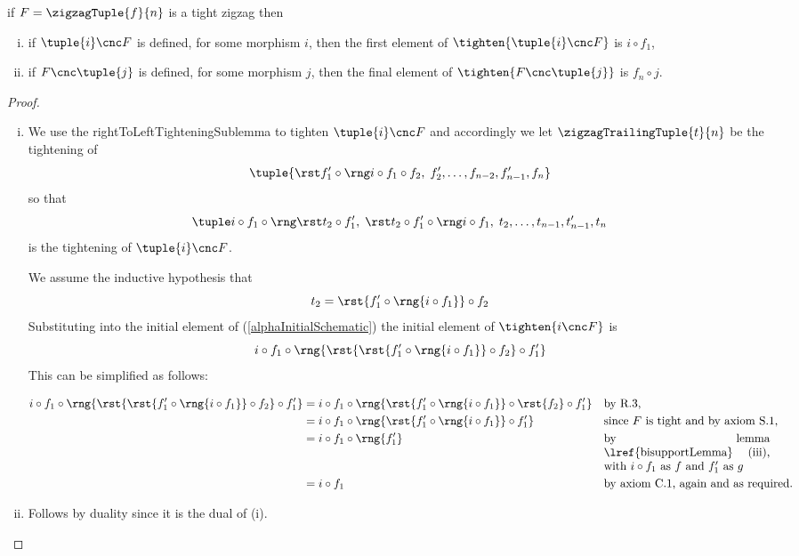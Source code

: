 \begin{lemma}
if $F=\zigzagTuple{f}{n}$ is a tight zigzag then
\begin{enumerate}[(i)]
\item if $\tuple{i} \cnc F$ is defined, 
for some morphism $i$, 
then the first element of $\tighten{\tuple{i} \cnc F}$ 
is $i \circ f_1$, 
\item if $F \cnc \tuple{j}$ is defined, 
for some morphism $j$, 
then the final element of $\tighten{F \cnc \tuple{j}}$ 
is $f_n \circ j$. 
\end{enumerate}
\end{lemma}
\begin{proof}
~
\begin{enumerate}[(i)]
\item %
We use the rightToLeftTighteningSublemma to tighten 
$\tuple{i} \cnc F$ and accordingly 
we let $\zigzagTrailingTuple{t}{n}$
be the tightening of
\[
\tuple{\tightTail[i]}
\]
so that 
\begin{equation}
\label{alphaInitialSchematic}
\rightToLeftTightening[i]
\end{equation}
is the tightening of $\tuple{i}\cnc F$.

\newcommand{\inductivets}
{\rst{ f'_1 \circ \rng{i \circ f_1}}\circ f_2}

We assume the inductive hypothesis that
\[
t_2 =  \inductivets
\]
Substituting into the initial element of
(\ref{alphaInitialSchematic})
the initial element of $\tighten{i\cnc F}$
is
\[
i\circ f_1 \circ \rng{\rst{\inductivets}\circ f'_1}
\]
This can be simplified as follows:

\begin{align*}
i\circ f_1\circ
\rng{\rst{\inductivets}\circ f'_1}
&=
i\circ f_1\circ
\rng{
 \rst{f'_1\circ\rng{i\circ f_1}}
 \circ \rst{f_2}
 \circ f'_1
}
&&\mbox{by R.3,} \\
&=
i\circ f_1\circ
\rng{
 \rst{f'_1\circ\rng{i\circ f_1}}
 \circ f'_1
}
&&\mbox{since $F$ is tight and by axiom S.1,} \\
&=
i\circ f_1\circ
\rng{f'_1}
&&\mbox{\parbox[t]{5cm}{by lemma \lref{bisupportLemma} (iii), 
with $i \circ f_1$ as $f$ and $f'_1$ as $g$} }\\
&=
i\circ f_1
&&\mbox{by axiom C.1, again and as required.}
\end{align*}
\item %
Follows by duality since it is the dual of (i).
\end{enumerate}
\end{proof}

